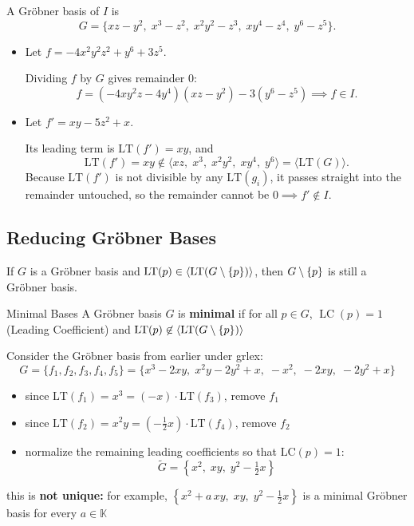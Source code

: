\documentclass[a4paper, 11pt]{report}
\newcommand{\gen}[1]{\langle #1 \rangle}
\newcommand{\LT}{\operatorname{LT}}
\newcommand{\LC}{\operatorname{LC}}
\begin{document}
A Gröbner basis of $I$ is
$$ G = \{xz - y^2,\; x^3 - z^2,\; x^2y^2 - z^3,\; xy^4 - z^4,\; y^6 - z^5\}. $$

\begin{itemize}
    \item Let $f = -4x^2y^2z^2 + y^6 + 3z^5$.

        Dividing $f$ by $G$ gives remainder $0$:
    $$ f = (-4xy^2z - 4y^4)(xz - y^2) - 3(y^6 - z^5) \implies f \in I. $$
    
    \item Let $f' = xy - 5z^2 + x$. 

        Its leading term is $\text{LT}(f') = xy$, and
    $$ \text{LT}(f') = xy \notin \langle xz,\; x^3,\; x^2y^2,\; xy^4,\; y^6 \rangle = \langle \text{LT}(G) \rangle. $$
    Because $\text{LT}(f')$ is not divisible by any $\text{LT}(g_i)$, it passes straight into the remainder untouched, so the remainder cannot be $0 \implies f' \notin I$.
\end{itemize}

\subsection{Reducing Gr\"obner Bases}
\begin{lemmaframe}{}{}
    If $G$ is a Gr\"obner basis and $\LT(p) \in \gen{\LT(G \setminus \set{p})}$, then $G \setminus \set{p}$ is still a Gr\"obner basis.
\end{lemmaframe}

\begin{defframe}{Minimal Bases}{}
    A Gr\"obner basis $G$ is \textbf{minimal} if for all $p \in G$, $\LC(p) =1$ (Leading Coefficient) and $\LT(p) \not \in \gen{\LT(G \setminus \set{p})}$ 
\end{defframe}

Consider the Gröbner basis from earlier under grlex:
$$ G = \{f_1, f_2, f_3, f_4, f_5\} = \{x^3 - 2xy,\; x^2y - 2y^2 + x,\; -x^2,\; -2xy,\; -2y^2 + x\} $$
\begin{itemize}
    \item since $\text{LT}(f_1) = x^3 = (-x) \cdot \text{LT}(f_3)$, remove $f_1$
    \item since $\text{LT}(f_2) = x^2y = \left(-\tfrac{1}{2}x\right) \cdot \text{LT}(f_4)$, remove $f_2$
    \item normalize the remaining leading coefficients so that $\text{LC}(p) = 1$:
    $$ \tilde{G} = \left\{x^2,\; xy,\; y^2 - \tfrac{1}{2}x\right\} $$
\end{itemize}
\noindent this is \textbf{not unique:} for example, $\left\{x^2 + a\,xy,\; xy,\; y^2 - \tfrac{1}{2}x\right\}$ is a minimal Gröbner basis for every $a \in \mathbb{K}$
\end{document}
